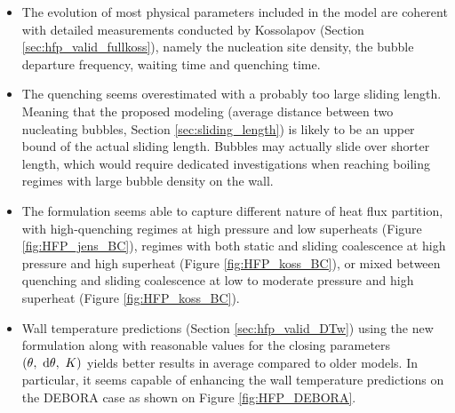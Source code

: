 \begin{itemize}
\item The evolution of most physical parameters included in the model are coherent with detailed measurements conducted by Kossolapov \cite{kossolapov_experimental_2021} (Section \ref{sec:hfp_valid_fullkoss}), namely the nucleation site density, the bubble departure frequency, waiting time and quenching time.

\item The quenching seems overestimated with a probably too large sliding length. Meaning that the proposed modeling (\ie average distance between two nucleating bubbles, Section \ref{sec:sliding_length}) is likely to be an upper bound of the actual sliding length. Bubbles may actually slide over shorter length, which would require dedicated investigations when reaching boiling regimes with large bubble density on the wall.

\item The formulation seems able to capture different nature of heat flux partition, with high-quenching regimes at high pressure and low superheats (Figure \ref{fig:HFP_jens_BC}), regimes with both static and sliding coalescence at high pressure and high superheat (Figure \ref{fig:HFP_koss_BC}), or mixed between quenching and sliding coalescence at low to moderate pressure and high superheat (Figure \ref{fig:HFP_koss_BC}).

\item Wall temperature predictions (Section \ref{sec:hfp_valid_DTw}) using the new formulation along with reasonable values for the closing parameters $\left( \theta,\ \mathrm{d}\theta,\ K  \right)$ yields better results in average compared to older models. In particular, it seems capable of enhancing the wall temperature predictions on the DEBORA case as shown on Figure \ref{fig:HFP_DEBORA}.

\end{itemize}
